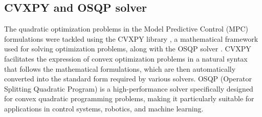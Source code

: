 \documentclass[a4paper,12pt,oneside]{book}
\begin{document}
\subsection*{CVXPY and OSQP solver}
The quadratic optimization problems in the Model Predictive Control (MPC) formulations were tackled using the CVXPY library \cite{diamond2016cvxpy}, a mathematical framework used for solving optimization problems, along with the OSQP solver \cite{Stellato_2020}.
CVXPY facilitates the expression of convex optimization problems in a natural syntax that follows the mathematical formulations, which are then automatically converted into the standard form required by various solvers.
OSQP (Operator Splitting Quadratic Program) is a high-performance solver specifically designed for convex quadratic programming problems, making it particularly suitable for applications in control systems, robotics, and machine learning.
\end{document}
